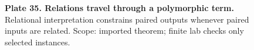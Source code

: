 \begin{figure}[p]\centering{}\caption{\textbf{Plate 35. Relations travel through a polymorphic term.} Relational interpretation constrains paired outputs whenever paired inputs are related. Scope: imported theorem; finite lab checks only selected instances.}\label{plate:relations-travel}\end{figure}

